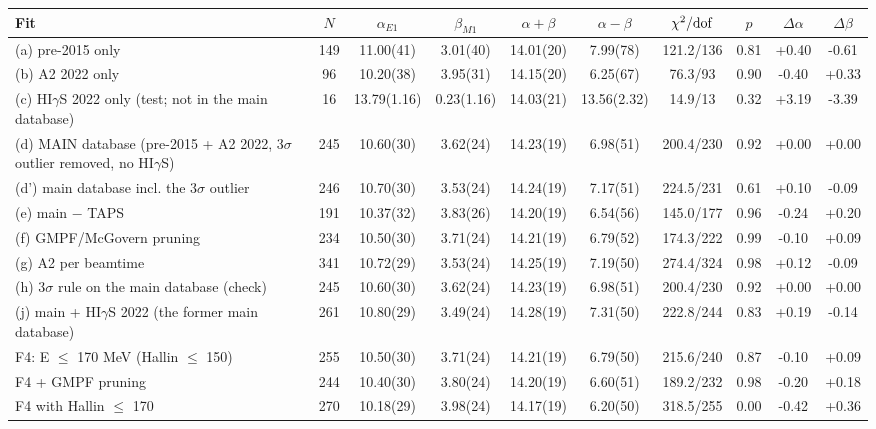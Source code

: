 \begin{tabular}{lccccccccc}
\hline
Fit & $N$ & $\alpha_{E1}$ & $\beta_{M1}$ & $\alpha+\beta$ & $\alpha-\beta$ & $\chi^2/{\rm dof}$ & $p$ & $\Delta\alpha$ & $\Delta\beta$ \\
\hline
(a) pre-2015 only & 149 & 11.00(41) & 3.01(40) & 14.01(20) & 7.99(78) & 121.2/136 & 0.81 & +0.40 & -0.61 \\
(b) A2 2022 only & 96 & 10.20(38) & 3.95(31) & 14.15(20) & 6.25(67) & 76.3/93 & 0.90 & -0.40 & +0.33 \\
(c) HI$\gamma$S 2022 only (test; not in the main database) & 16 & 13.79(1.16) & 0.23(1.16) & 14.03(21) & 13.56(2.32) & 14.9/13 & 0.32 & +3.19 & -3.39 \\
(d) MAIN database (pre-2015 + A2 2022, 3$\sigma$ outlier removed, no HI$\gamma$S) & 245 & 10.60(30) & 3.62(24) & 14.23(19) & 6.98(51) & 200.4/230 & 0.92 & +0.00 & +0.00 \\
(d') main database incl. the 3$\sigma$ outlier & 246 & 10.70(30) & 3.53(24) & 14.24(19) & 7.17(51) & 224.5/231 & 0.61 & +0.10 & -0.09 \\
(e) main $-$ TAPS & 191 & 10.37(32) & 3.83(26) & 14.20(19) & 6.54(56) & 145.0/177 & 0.96 & -0.24 & +0.20 \\
(f) GMPF/McGovern pruning & 234 & 10.50(30) & 3.71(24) & 14.21(19) & 6.79(52) & 174.3/222 & 0.99 & -0.10 & +0.09 \\
(g) A2 per beamtime & 341 & 10.72(29) & 3.53(24) & 14.25(19) & 7.19(50) & 274.4/324 & 0.98 & +0.12 & -0.09 \\
(h) 3$\sigma$ rule on the main database (check) & 245 & 10.60(30) & 3.62(24) & 14.23(19) & 6.98(51) & 200.4/230 & 0.92 & +0.00 & +0.00 \\
(j) main + HI$\gamma$S 2022 (the former main database) & 261 & 10.80(29) & 3.49(24) & 14.28(19) & 7.31(50) & 222.8/244 & 0.83 & +0.19 & -0.14 \\
F4: E $\le$ 170 MeV (Hallin $\le$ 150) & 255 & 10.50(30) & 3.71(24) & 14.21(19) & 6.79(50) & 215.6/240 & 0.87 & -0.10 & +0.09 \\
F4 + GMPF pruning & 244 & 10.40(30) & 3.80(24) & 14.20(19) & 6.60(51) & 189.2/232 & 0.98 & -0.20 & +0.18 \\
F4 with Hallin $\le$ 170 & 270 & 10.18(29) & 3.98(24) & 14.17(19) & 6.20(50) & 318.5/255 & 0.00 & -0.42 & +0.36 \\
\hline
\end{tabular}

